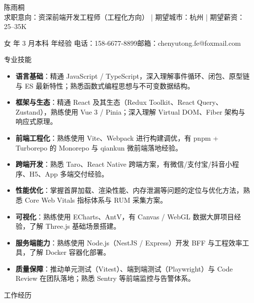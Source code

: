 \documentclass[10.5pt,fontset=windows]{ctexart}
\newcommand{\rsection}[1]{%
  \Needspace*{6\baselineskip}%
  \vspace{9pt}%
  {\color{maincolor}\heiti\zihao{4}#1}\par
  \vspace{1pt}{\color{maincolor}\rule{\textwidth}{1pt}}\par
  \vspace{3pt}}
\begin{document}
\begin{center}
  {\heiti 陈雨桐}\\[4pt]
  {求职意向：资深前端开发工程师（工程化方向）}\quad
  {\color{graytext}|}\quad
  {期望城市：杭州}\quad
  {\color{graytext}|}\quad
  {期望薪资：25--35K}
\end{center}
\vspace{2pt}
\begin{center}
  女 年 3 月\quad 本科 年经验\quad
  电话：158-6677-8899\quad 邮箱：chenyutong.fe@foxmail.com
\end{center}

\rsection{专业技能}
\begin{itemize}
  \item \textbf{语言基础}：精通 JavaScript / TypeScript，深入理解事件循环、闭包、原型链与 ES 最新特性；熟悉函数式编程思想与不可变数据结构。
  \item \textbf{框架与生态}：精通 React 及其生态（Redux Toolkit、React Query、Zustand），熟练使用 Vue 3 / Pinia；深入理解 Virtual DOM、Fiber 架构与响应式原理。
  \item \textbf{前端工程化}：熟练使用 Vite、Webpack 进行构建调优，有 pnpm + Turborepo 的 Monorepo 与 qiankun 微前端落地经验。
  \item \textbf{跨端开发}：熟悉 Taro、React Native 跨端方案，有微信/支付宝/抖音小程序、H5、App 多端交付经验。
  \item \textbf{性能优化}：掌握首屏加载、渲染性能、内存泄漏等问题的定位与优化方法，熟悉 Core Web Vitals 指标体系与 RUM 采集方案。
  \item \textbf{可视化}：熟练使用 ECharts、AntV，有 Canvas / WebGL 数据大屏项目经验，了解 Three.js 基础场景搭建。
  \item \textbf{服务端能力}：熟练使用 Node.js（NestJS / Express）开发 BFF 与工程效率工具，了解 Docker 容器化部署。
  \item \textbf{质量保障}：推动单元测试（Vitest）、端到端测试（Playwright）与 Code Review 在团队落地；熟悉 Sentry 等前端监控与告警体系。
\end{itemize}

\rsection{工作经历}
\end{document}
